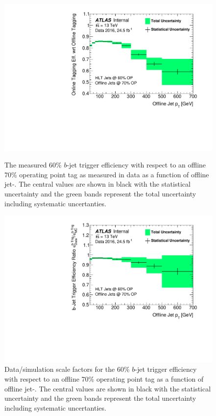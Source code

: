 \begin{figure}[!ht]
  \begin{center}
    \includegraphics[width=0.8\linewidth, angle=0]{figs/Trigger/btrigger_old/fullSyst_Efficiency_jetPt.pdf}
  \end{center}
  \caption{
    The measured 60\% $b$-jet trigger efficiency with respect to an offline 70\% operating point tag
    as measured in data as a function of offline jet-\pT.
    The central values are shown in black with the statistical uncertainty and the green bands represent the total uncertainty including systematic uncertanties.
    \label{fig:bTrig_jetSys_eff}
  }
  \begin{center}
    \includegraphics[width=0.8\linewidth, angle=0]{figs/Trigger/btrigger_old/fullSyst_ScaleFactor_jetPt.pdf}
  \end{center}
  \caption{
    Data/simulation scale factors for the 60\% $b$-jet trigger efficiency with respect to an offline 70\% operating point tag
    as a function of offline jet-\pT.
    The central values are shown in black with the statistical uncertainty and the green bands represent the total uncertainty including systematic uncertanties.
    \label{fig:bTrig_jetSys_SF}
  }
\end{figure}

